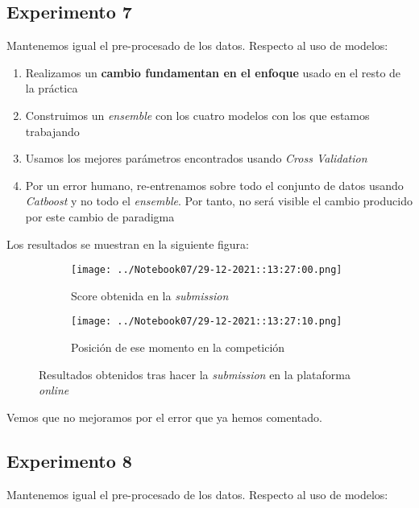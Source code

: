 \documentclass[11pt]{article}
\begin{document}
\pagebreak

\subsection{Experimento 7}

Mantenemos igual el pre-procesado de los datos. Respecto al uso de modelos:

\begin{enumerate}
    \item Realizamos un \textbf{cambio fundamentan en el enfoque} usado en el resto de la práctica
    \item Construimos un \emph{ensemble} con los cuatro modelos con los que estamos trabajando
    \item Usamos los mejores parámetros encontrados usando \emph{Cross Validation}
    \item Por un error humano, re-entrenamos sobre todo el conjunto de datos usando \emph{Catboost} y no todo el \emph{ensemble}. Por tanto, no será visible el cambio producido por este cambio de paradigma
\end{enumerate}

Los resultados se muestran en la siguiente figura:

\begin{figure}[H]
    \centering

    \begin{subfigure}[b]{0.45 \textwidth}
        \texttt{[image: ../Notebook07/29-12-2021::13:27:00.png]}
        \caption{Score obtenida en la \emph{submission}}
    \end{subfigure}
    \begin{subfigure}[b]{0.45 \textwidth}
        \texttt{[image: ../Notebook07/29-12-2021::13:27:10.png]}
        \caption{Posición de ese momento en la competición}
    \end{subfigure}

    \caption{Resultados obtenidos tras hacer la \emph{submission} en la plataforma \emph{online}}
\end{figure}

Vemos que no mejoramos por el error que ya hemos comentado.

\pagebreak

\subsection{Experimento 8}

Mantenemos igual el pre-procesado de los datos. Respecto al uso de modelos:
\end{document}
